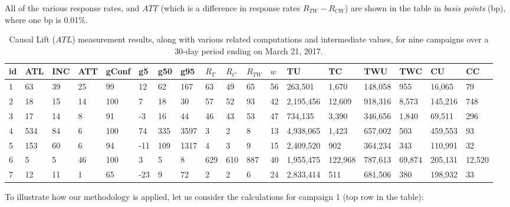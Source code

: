 \documentclass[11pt,a4paper]{article}
\theoremstyle{definition}
\theoremstyle{remark}
\theoremstyle{definition}
\theoremstyle{definition}
\theoremstyle{definition}
\theoremstyle{definition}
\theoremstyle{definition}
\theoremstyle{definition}
\begin{document}
All of the various response rates, and $ATT$ (which is a difference in response rates $R_{TW} - R_{CW}$) are shown in the table in \textit{basis points} (bp), where one bp is 0.01\%.


\begin{table} 
\small
\caption{\small Causal Lift ($ATL$) measurement results, along with various related computations and intermediate values, for nine campaigns over a 30-day period ending on March 21, 2017.}
\label{tab-results}
\begin{tabular}{|l|l|l|l|l|l|l|l|l|l|l|l|l|l|l|l|l|l|}
\hline
id & ATL & INC & ATT & gConf & g5  & g50 & g95  & $R_T$   & $R_C$   & $R_{TW}$  & $w$  & TU      & TC     & TWU    & TWC   & CU     & CC    \\
\hline \hline 
1   & 63  & 39  & 25  & 99    & 12  & 62  & 167  & 63   & 49   & 65   & 56 & 263,501  & 1,670   & 148,058 & 955   & 16,065  & 79    \\
2   & 18  & 15  & 14  & 100   & 7   & 18  & 30   & 57   & 52   & 93   & 42 & 2,195,456 & 12,609  & 918,316 & 8,573  & 145,216 & 748   \\
3   & 17  & 14  & 8   & 91    & -3  & 16  & 44   & 46   & 43   & 53   & 47 & 734,135  & 3,390   & 346,656 & 1,840  & 69,511  & 296   \\
4   & 534 & 84  & 6   & 100   & 74  & 335 & 3597 & 3    & 2    & 8    & 13 & 4,938,065 & 1,423   & 657,002 & 503   & 459,553 & 93    \\
5   & 153 & 60  & 6   & 94    & -11 & 109 & 1317 & 4    & 3    & 9    & 15 & 2,409,520 & 902    & 364,234 & 343   & 110,991 & 32    \\
6   & 5   & 5   & 46  & 100   & 3   & 5   & 8    & 629  & 610  & 887  & 40 & 1,955,475 & 122,968 & 787,613 & 69,874 & 205,131 & 12,520 \\
7   & 12  & 11  & 1   & 65    & -23 & 9   & 72   & 2    & 2    & 6    & 24 & 2,833,414 & 511    & 681,506 & 380   & 198,932 & 33    \\
\end{tabular}
\end{table}


To illustrate how our methodology is applied, let us consider the calculations for campaign 1 (top row in the table):
\end{document}

